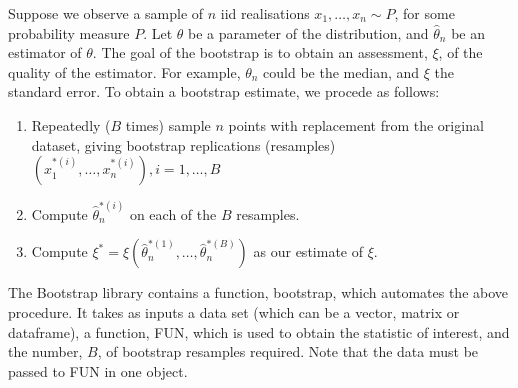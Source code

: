\documentclass{article}\usepackage[]{graphicx}\usepackage[]{color}
\begin{document}
Suppose we observe a sample of $n$ iid realisations  $x_1,\ldots, x_n \sim P$, for some probability measure $P$. Let $\theta$ be a parameter of the distribution, and $\hat\theta_n$ be an estimator of $\theta$. The goal of the bootstrap is to obtain an assessment, $\xi$, of the quality of the estimator. For example, $\theta_n$ could be the median, and $\xi$ the standard error. To obtain a bootstrap estimate, we procede as follows:

\begin{enumerate}
\item Repeatedly ($B$ times) sample $n$ points with replacement from the original
dataset, giving bootstrap replications (resamples) $(x_1^{*(i)},\ldots,x_n^{*(i)}), i=1,\ldots,B$
\item Compute $\hat\theta_n^{*(i)}$ on each of the $B$ resamples.
\item Compute $\xi^*=\xi(\hat\theta_n^{*(1)},\ldots,\hat\theta_n^{*(B)})$ as our estimate of $\xi$.
\end{enumerate}

The Bootstrap library contains a function, bootstrap, which automates the above procedure. It takes as inputs a data set (which can be a vector, matrix or dataframe), a function, FUN, which is used to obtain the statistic of interest, and the number, $B$, of bootstrap resamples required. Note that the data must be passed to FUN in one object.
\end{document}
